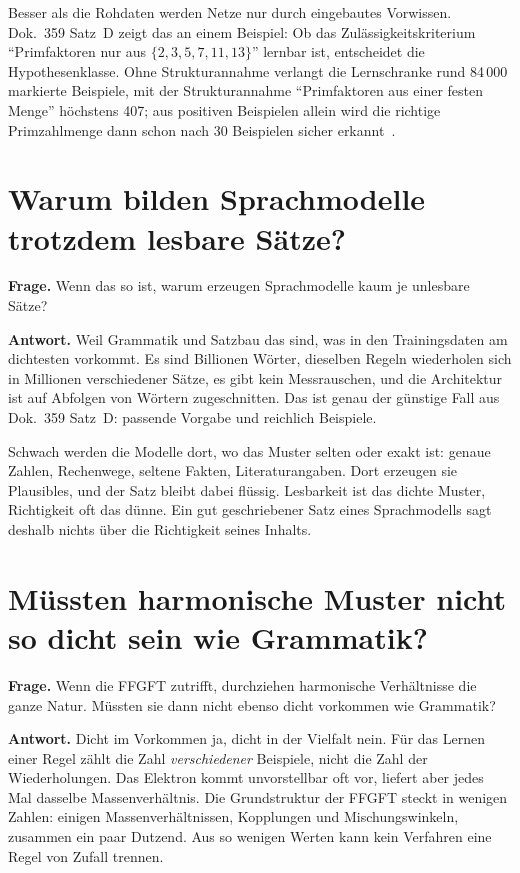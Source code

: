 Besser als die Rohdaten werden Netze nur durch eingebautes Vorwissen. Dok.~359 Satz~D zeigt das an
einem Beispiel: Ob das Zulässigkeitskriterium \enquote{Primfaktoren nur aus $\{2,3,5,7,11,13\}$}
lernbar ist, entscheidet die Hypothesenklasse. Ohne Strukturannahme verlangt die Lernschranke rund
84\,000 markierte Beispiele, mit der Strukturannahme \enquote{Primfaktoren aus einer festen Menge}
höchstens 407; aus positiven Beispielen allein wird die richtige Primzahlmenge dann schon nach 30
Beispielen sicher erkannt \KM\,\cite{ShalevShwartz2014}.

\section{Warum bilden Sprachmodelle trotzdem lesbare Sätze?}

\textbf{Frage.} Wenn das so ist, warum erzeugen Sprachmodelle kaum je unlesbare Sätze?

\textbf{Antwort.} Weil Grammatik und Satzbau das sind, was in den Trainingsdaten am dichtesten
vorkommt. Es sind Billionen Wörter, dieselben Regeln wiederholen sich in Millionen verschiedener
Sätze, es gibt kein Messrauschen, und die Architektur ist auf Abfolgen von Wörtern zugeschnitten. Das
ist genau der günstige Fall aus Dok.~359 Satz~D: passende Vorgabe und reichlich Beispiele.

Schwach werden die Modelle dort, wo das Muster selten oder exakt ist: genaue Zahlen, Rechenwege,
seltene Fakten, Literaturangaben. Dort erzeugen sie Plausibles, und der Satz bleibt dabei flüssig.
Lesbarkeit ist das dichte Muster, Richtigkeit oft das dünne. Ein gut geschriebener Satz eines
Sprachmodells sagt deshalb nichts über die Richtigkeit seines Inhalts.

\section{Müssten harmonische Muster nicht so dicht sein wie Grammatik?}

\textbf{Frage.} Wenn die FFGFT zutrifft, durchziehen harmonische Verhältnisse die ganze Natur. Müssten
sie dann nicht ebenso dicht vorkommen wie Grammatik?

\textbf{Antwort.} Dicht im Vorkommen ja, dicht in der Vielfalt nein. Für das Lernen einer Regel zählt
die Zahl \emph{verschiedener} Beispiele, nicht die Zahl der Wiederholungen. Das Elektron kommt
unvorstellbar oft vor, liefert aber jedes Mal dasselbe Massenverhältnis. Die Grundstruktur der FFGFT
steckt in wenigen Zahlen: einigen Massenverhältnissen, Kopplungen und Mischungswinkeln, zusammen ein
paar Dutzend. Aus so wenigen Werten kann kein Verfahren eine Regel von Zufall trennen.

